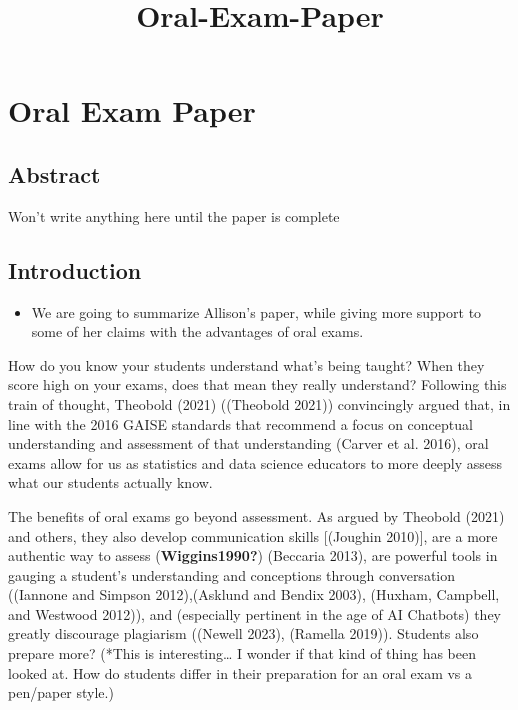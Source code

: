 \documentclass[
  letterpaper,
  DIV=11,
  numbers=noendperiod]{scrartcl}
\title{Oral-Exam-Paper}
\author{}
\date{}
\providecommand{\tightlist}{%
  \setlength{\itemsep}{0pt}\setlength{\parskip}{0pt}}\usepackage{longtable,booktabs,array}
\begin{document}
\maketitle
\ifdefined\Shaded\renewenvironment{Shaded}{\begin{tcolorbox}[sharp corners, breakable, frame hidden, interior hidden, enhanced, boxrule=0pt, borderline west={3pt}{0pt}{shadecolor}]}{\end{tcolorbox}}\fi

\hypertarget{oral-exam-paper}{%
\section{Oral Exam Paper}\label{oral-exam-paper}}

\hypertarget{abstract}{%
\subsection{Abstract}\label{abstract}}

Won't write anything here until the paper is complete

\hypertarget{introduction}{%
\subsection{Introduction}\label{introduction}}

\begin{itemize}
\tightlist
\item
  We are going to summarize Allison's paper, while giving more support
  to some of her claims with the advantages of oral exams.
\end{itemize}

How do you know your students understand what's being taught? When they
score high on your exams, does that mean they really understand?
Following this train of thought, Theobold (2021) ((Theobold 2021))
convincingly argued that, in line with the 2016 GAISE standards that
recommend a focus on conceptual understanding and assessment of that
understanding (Carver et al. 2016), oral exams allow for us as
statistics and data science educators to more deeply assess what our
students actually know.

The benefits of oral exams go beyond assessment. As argued by Theobold
(2021) and others, they also develop communication skills {[}(Joughin
2010){]}, are a more authentic way to assess (\textbf{Wiggins1990?})
(Beccaria 2013), are powerful tools in gauging a student's understanding
and conceptions through conversation ((Iannone and Simpson
2012),(Asklund and Bendix 2003), (Huxham, Campbell, and Westwood 2012)),
and (especially pertinent in the age of AI Chatbots) they greatly
discourage plagiarism ((Newell 2023), (Ramella 2019)). Students also
prepare more? (*This is interesting\ldots{} I wonder if that kind of
thing has been looked at. How do students differ in their preparation
for an oral exam vs a pen/paper style.)
\end{document}
